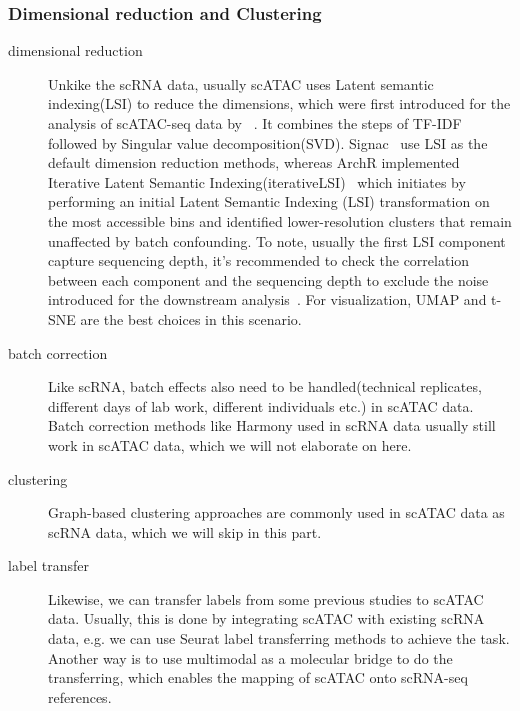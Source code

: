 \subsubsection{Dimensional reduction and Clustering}
\begin{description}
	\item[dimensional reduction] 
	Unkike the scRNA data, usually scATAC uses Latent semantic indexing(LSI) to reduce the dimensions, which were first introduced for the analysis of scATAC-seq data by ~\citep{cusanovich2015multiplex}. It combines the steps of TF-IDF followed by Singular value decomposition(SVD). Signac~\citep{signac} use LSI as the default dimension reduction methods, whereas ArchR implemented Iterative Latent Semantic Indexing(iterativeLSI)~\citep{satpathy2019massively, granja2019single} which initiates by performing an initial Latent Semantic Indexing (LSI) transformation on the most accessible bins and identified lower-resolution clusters that remain unaffected by batch confounding. To note, usually the first LSI component capture sequencing depth, it's recommended to check the correlation between each component and the sequencing depth to exclude the noise introduced for the downstream analysis~\citep{signac}. For visualization, UMAP and t-SNE are the best choices in this scenario.
	
	\item[batch correction]
	 Like scRNA, batch effects also need to be handled(technical replicates, different days of lab work, different individuals etc.) in scATAC data. Batch correction methods like Harmony\citep{korsunsky2019harmony} used in scRNA data usually still work in scATAC data, which we will not elaborate on here.
	
	 \item[clustering]
	 Graph-based clustering approaches are commonly used in scATAC data as scRNA data, which we will skip in this part.
	
	 \item[label transfer]
	 Likewise, we can transfer labels from some previous studies to scATAC data. Usually, this is done by integrating scATAC with existing scRNA data, e.g. we can use Seurat\citep{stuart2019seurat3} label transferring methods to achieve the task. Another way is to use multimodal as a molecular bridge to do the transferring, which enables the mapping of scATAC onto scRNA-seq references\citep{hao2023dictionary}.
	

\end{description}
